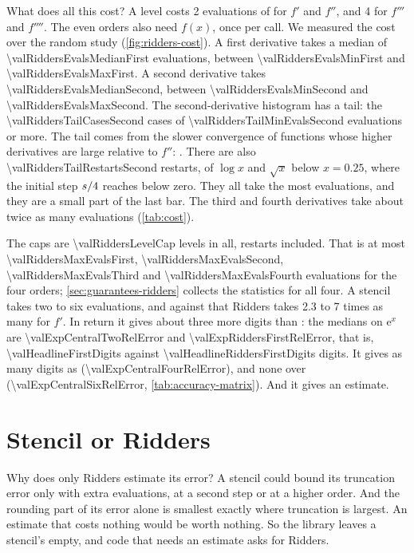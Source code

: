 What does all this cost? A level costs 2 evaluations of  for $f'$ and $f''$, and 4 for $f'''$ and
$f''''$. The even orders also need $f(x)$, once per call. We measured the cost over the random study
(\cref{fig:ridders-cost}). A first derivative takes a median of \num{\valRiddersEvalsMedianFirst} evaluations, between
\num{\valRiddersEvalsMinFirst} and \num{\valRiddersEvalsMaxFirst}. A second derivative takes
\num{\valRiddersEvalsMedianSecond}, between \num{\valRiddersEvalsMinSecond} and \num{\valRiddersEvalsMaxSecond}. The
second-derivative histogram has a tail: the \num{\valRiddersTailCasesSecond} cases of
\num{\valRiddersTailMinEvalsSecond} evaluations or more. The tail comes from the slower convergence of functions whose
higher derivatives are large relative to $f''$: \valRiddersTailFunctionsSecond. There are also
\num{\valRiddersTailRestartsSecond} restarts, of $\log x$ and $\sqrt{x}$ below $x = 0.25$, where the initial step
$s / 4$ reaches below zero. They all take the most evaluations, and they are a small part of the last bar. The
third and fourth derivatives take about twice as many evaluations (\cref{tab:cost}).

The caps are \num{\valRiddersLevelCap} levels in all, restarts included. That is at most \num{\valRiddersMaxEvalsFirst},
\num{\valRiddersMaxEvalsSecond}, \num{\valRiddersMaxEvalsThird} and \num{\valRiddersMaxEvalsFourth} evaluations for
the four orders; \cref{sec:guarantees-ridders} collects the statistics for all four. A stencil takes two to six
evaluations, and against that Ridders takes 2.3 to 7 times as many for $f'$. In return it gives about three more
digits than : the medians on $\mathrm{e}^x$ are \num{\valExpCentralTwoRelError} and
\num{\valExpRiddersFirstRelError}, that is, \num{\valHeadlineFirstDigits} against
\num{\valHeadlineRiddersFirstDigits} digits. It gives as many digits as 
(\num{\valExpCentralFourRelError}), and none over  (\num{\valExpCentralSixRelError},
\cref{tab:accuracy-matrix}). And it gives an estimate.

\section{Stencil or Ridders}\label{sec:ridders-choice}

Why does only Ridders estimate its error? A stencil could bound its truncation error only with extra evaluations,
at a second step or at a higher order. And the rounding part of its error alone is smallest exactly where truncation
is largest. An estimate that costs nothing would be worth nothing. So the library leaves a stencil's
 empty, and code that needs an estimate asks for Ridders.

